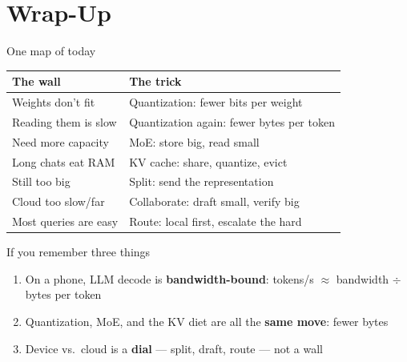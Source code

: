 
\section[Wrap-up]{Wrap-Up}


\begin{frame}{One map of today}
  \vspace{0.5em}
  \centering
  \begin{tabular}{@{}ll@{}}
    \toprule
    \textbf{The wall} & \textbf{The trick}\\
    \midrule
    Weights don't fit & Quantization: fewer bits per weight\\
    Reading them is slow & Quantization again: fewer bytes per token\\
    Need more capacity & MoE: store big, read small\\
    Long chats eat RAM & KV cache: share, quantize, evict\\
    Still too big & Split: send the representation\\
    Cloud too slow/far & Collaborate: draft small, verify big\\
    Most queries are easy & Route: local first, escalate the hard\\
    \bottomrule
  \end{tabular}

  \vspace{0.8em}
\end{frame}

\begin{frame}{If you remember three things}
  \vspace{0.8em}
  \raggedright
  \begin{enumerate}\itemsep9pt
    \item On a phone, LLM decode is \textbf{bandwidth-bound}: tokens/s
      $\approx$ bandwidth $\div$ bytes per token
    \item Quantization, MoE, and the KV diet are all the \textbf{same move}:
      fewer bytes
    \item Device vs.\ cloud is a \textbf{dial} --- split, draft, route ---
      not a wall
  \end{enumerate}
\end{frame}

